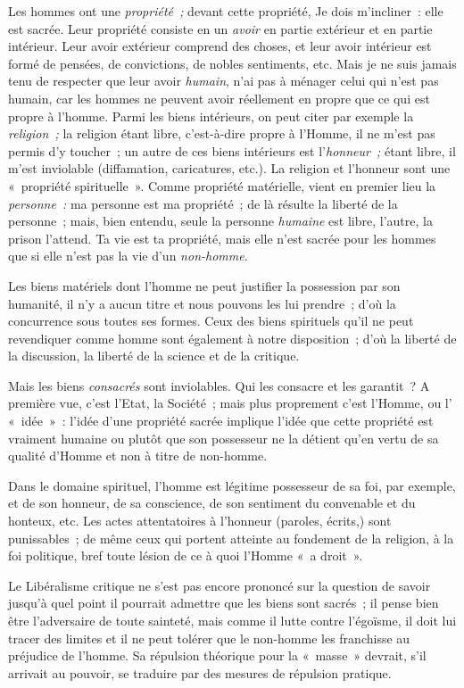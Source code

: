 \documentclass[french,twoside]{book} %
\begin{document}
Les hommes ont une \emph{propriété ;} devant cette propriété, Je dois m’incliner : elle est sacrée. Leur propriété consiste en un \emph{avoir} en partie extérieur et en partie intérieur. Leur avoir extérieur comprend des choses, et leur avoir intérieur est formé de pensées, de convictions, de nobles sentiments, etc. Mais je ne suis jamais tenu de respecter que leur avoir \emph{humain}, n’ai pas à ménager celui qui n’est pas humain, car les hommes ne peuvent avoir réellement en propre que ce qui est propre à l’homme. Parmi les biens intérieurs, on peut citer par exemple la \emph{religion ;} la religion étant libre, c’est-à-dire propre à l’Homme, il ne m’est pas permis d’y toucher ; un autre de ces biens intérieurs est l’\emph{honneur ;} étant libre, il m’est inviolable (diffamation, caricatures, etc.). La religion  et l’honneur sont une « propriété spirituelle ». Comme propriété matérielle, vient en premier lieu la \emph{personne :} ma personne est ma propriété ; de là résulte la liberté de la personne ; mais, bien entendu, seule la personne \emph{humaine} est libre, l’autre, la prison l’attend. Ta vie est ta propriété, mais elle n’est sacrée pour les hommes que si elle n’est pas la vie d’un \emph{non-homme}.\par
Les biens matériels dont l’homme ne peut justifier la possession par son humanité, il n’y a aucun titre et nous pouvons les lui prendre ; d’où la concurrence sous toutes ses formes. Ceux des biens spirituels qu’il ne peut revendiquer comme homme sont également à notre disposition ; d’où la liberté de la discussion, la liberté de la science et de la critique.\par
Mais les biens \emph{consacrés} sont inviolables. Qui les consacre et les garantit ? A première vue, c’est l’Etat, la Société ; mais plus proprement c’est l’Homme, ou l’ « idée » : l’idée d’une propriété sacrée implique l’idée que cette propriété est vraiment humaine ou plutôt que son possesseur ne la détient qu’en vertu de sa qualité d’Homme et non à titre de non-homme.\par
Dans le domaine spirituel, l’homme est légitime possesseur de sa foi, par exemple, et de son honneur, de sa conscience, de son sentiment du convenable et du honteux, etc. Les actes attentatoires à l’honneur (paroles, écrits,) sont punissables ; de même ceux qui portent atteinte au fondement de la religion, à la foi politique, bref toute lésion de ce à quoi l’Homme « a droit ».\par
Le Libéralisme critique ne s’est pas encore prononcé sur la question de savoir jusqu’à quel point il pourrait admettre que les biens sont sacrés ; il pense bien être l’adversaire de toute sainteté, mais comme il lutte contre l’égoïsme, il doit lui tracer des limites et il ne peut tolérer que le non-homme les franchisse au préjudice de l’homme. Sa répulsion théorique  pour la « masse » devrait, s’il arrivait au pouvoir, se traduire par des mesures de répulsion pratique.\par
\end{document}

